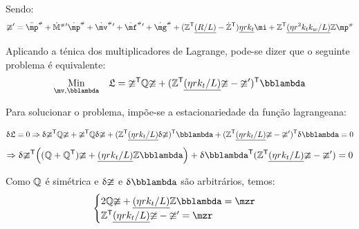 \documentclass[a4paper,11pt,brazil,fleqn]{article}
\begin{document}
Sendo:
\begin{equation} \label{eq:muplinha}
\mup' = \ddot{\mp}\ssh + {{\dot{\mM}}\ssh}{'} \dot{\mp}\ssh + {\dot{\mv}\ssh}{'} + {\dot{\mf}\ssh}{'} + {\dot{\mg}\ssh} + ( \mZ^\msT  \underline{(R/L)} - \dot{\mZ}^\msT ) \underline{\eta r k_t} \mi + \mZ^\msT  \underline{(\eta r^2 k_t k_w / L)}  \mZ \mp\ssh
\end{equation}

Aplicando a t\'enica dos multiplicadores de Lagrange, pode-se dizer que o seguinte problema \'e equivalente:
\begin{equation}
\begin{aligned}
& \underset{\mv, \mlambda}{\text{Min}}
& & \mathfrak{L} = \mup^\msT \mQ \mup + (\mZ^\msT  \underline{(\eta r k_t / L)} \mup - \mup')^\msT \mlambda \\
\end{aligned}
\end{equation}


Para solucionar o problema, imp\~oe-se a estacionariedade da fun\c{c}\~ao lagrangeana:

$$ \dl \mathfrak{L} = 0 \Rightarrow \dl \mup^\msT \mQ \mup + \mup^\msT \mQ \dl \mup + (\mZ^\msT  \underline{(\eta r k_t / L)} \dl \mup)^\msT \mlambda + (\mZ^\msT  \underline{(\eta r k_t / L)} \mup - \mup')^\msT \dl \mlambda = 0 $$
$$ \Rightarrow \dl \mup^\msT \Big( (\mQ + \mQ^\msT)\mup + \underline{(\eta r k_t / L)} \mZ \mlambda \Big) + \dl \mlambda^\msT (\mZ^\msT  \underline{(\eta r k_t / L)} \mup - \mup') = 0 $$

Como $\mathbb{Q}$ \'e sim\'etrica e ${\updelta} \mathbb{\upsilon}$ e $\dl \mlambda$ s\~ao arbitr\'arios, temos:
\begin{equation} \label{eq:OptimizationSol_}
\begin{cases}
2 \mQ \mup + \underline{(\eta r k_t / L)} \mZ \mlambda = \mzr \\
\mZ^\msT  \underline{(\eta r k_t / L)} \mup - \mup' = \mzr
\end{cases}
\end{equation}
\end{document}
